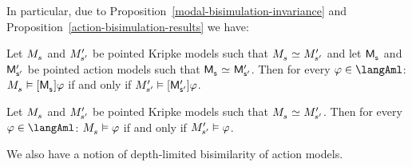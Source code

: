 In particular, due to Proposition~\ref{modal-bisimulation-invariance} and Proposition~\ref{action-bisimulation-results} we have:

\begin{proposition}\label{aml-bisimilar-actions}
Let $\kPModel{\kStateS}$ and ${M^{\prime}_{{s}^{\prime}}}$ be pointed Kripke models such that $\kPModel{\kStateS} \bisimilar \kPModelP{\kStateSP}$ and
let $\aPModel{\aStateS}$ and ${\mathsf{M}^{\prime}_{{\mathsf{{s}}^{\prime}}}}$ be pointed action models such that $\aPModel{\aStateS} \bisimilar \aPModelP{\aStateSP}$.
Then for every $\phi \in \langAml$: $\kPModel{\kStateS} \entails \actionA{\aPModel{\aStateS}} \phi$ if and only if ${M^{\prime}_{{s}^{\prime}}} \vDash {[ {\ensuremath{{\mathsf{M}^{\prime}_{{\mathsf{{s}}^{\prime}}}}}} ]} \varphi$.
\end{proposition}

\begin{proposition}\label{aml-bisimulation-invariance}
Let $\kPModel{\kStateS}$ and ${M^{\prime}_{{s}^{\prime}}}$ be pointed Kripke models such that $\kPModel{\kStateS} \bisimilar \kPModelP{\kStateSP}$.
Then for every $\phi \in \langAml$: $\kPModel{\kStateS} \entails \phi$ if and only if ${M^{\prime}_{{s}^{\prime}}} \vDash \varphi$.
\end{proposition}

We also have a notion of depth-limited bisimilarity of action models.

